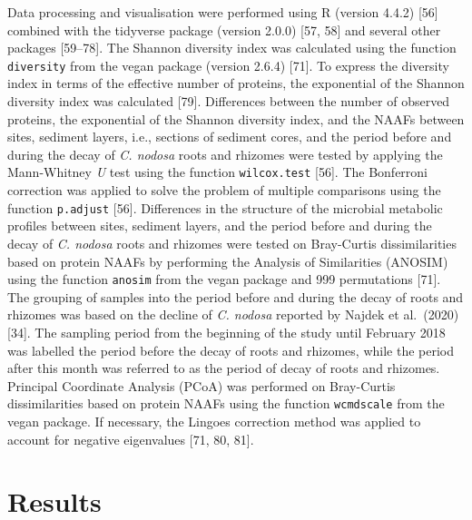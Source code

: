 \documentclass[
  12 pt,
]{article}
\begin{document}
Data processing and visualisation were performed using R (version 4.4.2) {[}56{]} combined with the tidyverse package (version 2.0.0) {[}57, 58{]} and several other packages {[}59--78{]}. The Shannon diversity index was calculated using the function \texttt{diversity} from the vegan package (version 2.6.4) {[}71{]}. To express the diversity index in terms of the effective number of proteins, the exponential of the Shannon diversity index was calculated {[}79{]}. Differences between the number of observed proteins, the exponential of the Shannon diversity index, and the NAAFs between sites, sediment layers, i.e., sections of sediment cores, and the period before and during the decay of \emph{C. nodosa} roots and rhizomes were tested by applying the Mann-Whitney \emph{U} test using the function \texttt{wilcox.test} {[}56{]}. The Bonferroni correction was applied to solve the problem of multiple comparisons using the function \texttt{p.adjust} {[}56{]}. Differences in the structure of the microbial metabolic profiles between sites, sediment layers, and the period before and during the decay of \emph{C. nodosa} roots and rhizomes were tested on Bray-Curtis dissimilarities based on protein NAAFs by performing the Analysis of Similarities (ANOSIM) using the function \texttt{anosim} from the vegan package and 999 permutations {[}71{]}. The grouping of samples into the period before and during the decay of roots and rhizomes was based on the decline of \emph{C. nodosa} reported by Najdek et al.~(2020) {[}34{]}. The sampling period from the beginning of the study until February 2018 was labelled the period before the decay of roots and rhizomes, while the period after this month was referred to as the period of decay of roots and rhizomes. Principal Coordinate Analysis (PCoA) was performed on Bray-Curtis dissimilarities based on protein NAAFs using the function \texttt{wcmdscale} from the vegan package. If necessary, the Lingoes correction method was applied to account for negative eigenvalues {[}71, 80, 81{]}.

\newpage

\hypertarget{results}{%
\section{Results}\label{results}}
\end{document}

